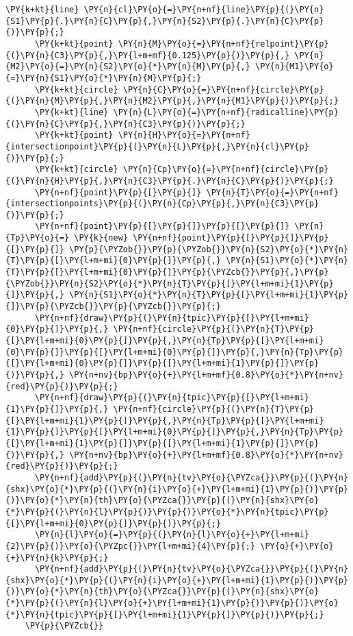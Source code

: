 \begin{Verbatim}[commandchars=\\\{\}]
      \PY{k+kt}{line} \PY{n}{cl}\PY{o}{=}\PY{n+nf}{line}\PY{p}{(}\PY{n}{S1}\PY{p}{.}\PY{n}{C}\PY{p}{,}\PY{n}{S2}\PY{p}{.}\PY{n}{C}\PY{p}{)}\PY{p}{;}
      \PY{k+kt}{point} \PY{n}{M}\PY{o}{=}\PY{n+nf}{relpoint}\PY{p}{(}\PY{n}{C3}\PY{p}{,}\PY{l+m+mf}{0.125}\PY{p}{)}\PY{p}{,} \PY{n}{M2}\PY{o}{=}\PY{n}{S2}\PY{o}{*}\PY{n}{M}\PY{p}{,} \PY{n}{M1}\PY{o}{=}\PY{n}{S1}\PY{o}{*}\PY{n}{M}\PY{p}{;}
      \PY{k+kt}{circle} \PY{n}{C}\PY{o}{=}\PY{n+nf}{circle}\PY{p}{(}\PY{n}{M}\PY{p}{,}\PY{n}{M2}\PY{p}{,}\PY{n}{M1}\PY{p}{)}\PY{p}{;}
      \PY{k+kt}{line} \PY{n}{L}\PY{o}{=}\PY{n+nf}{radicalline}\PY{p}{(}\PY{n}{C}\PY{p}{,}\PY{n}{C3}\PY{p}{)}\PY{p}{;}
      \PY{k+kt}{point} \PY{n}{H}\PY{o}{=}\PY{n+nf}{intersectionpoint}\PY{p}{(}\PY{n}{L}\PY{p}{,}\PY{n}{cl}\PY{p}{)}\PY{p}{;}
      \PY{k+kt}{circle} \PY{n}{Cp}\PY{o}{=}\PY{n+nf}{circle}\PY{p}{(}\PY{n}{H}\PY{p}{,}\PY{n}{C3}\PY{p}{.}\PY{n}{C}\PY{p}{)}\PY{p}{;}
      \PY{n+nf}{point}\PY{p}{[}\PY{p}{]} \PY{n}{T}\PY{o}{=}\PY{n+nf}{intersectionpoints}\PY{p}{(}\PY{n}{Cp}\PY{p}{,}\PY{n}{C3}\PY{p}{)}\PY{p}{;}
      \PY{n+nf}{point}\PY{p}{[}\PY{p}{]}\PY{p}{[}\PY{p}{]} \PY{n}{Tp}\PY{o}{=} \PY{k}{new} \PY{n+nf}{point}\PY{p}{[}\PY{p}{]}\PY{p}{[}\PY{p}{]} \PY{p}{\PYZob{}}\PY{p}{\PYZob{}}\PY{n}{S2}\PY{o}{*}\PY{n}{T}\PY{p}{[}\PY{l+m+mi}{0}\PY{p}{]}\PY{p}{,} \PY{n}{S1}\PY{o}{*}\PY{n}{T}\PY{p}{[}\PY{l+m+mi}{0}\PY{p}{]}\PY{p}{\PYZcb{}}\PY{p}{,}\PY{p}{\PYZob{}}\PY{n}{S2}\PY{o}{*}\PY{n}{T}\PY{p}{[}\PY{l+m+mi}{1}\PY{p}{]}\PY{p}{,} \PY{n}{S1}\PY{o}{*}\PY{n}{T}\PY{p}{[}\PY{l+m+mi}{1}\PY{p}{]}\PY{p}{\PYZcb{}}\PY{p}{\PYZcb{}}\PY{p}{;}
      \PY{n+nf}{draw}\PY{p}{(}\PY{n}{tpic}\PY{p}{[}\PY{l+m+mi}{0}\PY{p}{]}\PY{p}{,} \PY{n+nf}{circle}\PY{p}{(}\PY{n}{T}\PY{p}{[}\PY{l+m+mi}{0}\PY{p}{]}\PY{p}{,}\PY{n}{Tp}\PY{p}{[}\PY{l+m+mi}{0}\PY{p}{]}\PY{p}{[}\PY{l+m+mi}{0}\PY{p}{]}\PY{p}{,}\PY{n}{Tp}\PY{p}{[}\PY{l+m+mi}{0}\PY{p}{]}\PY{p}{[}\PY{l+m+mi}{1}\PY{p}{]}\PY{p}{)}\PY{p}{,} \PY{n+nv}{bp}\PY{o}{+}\PY{l+m+mf}{0.8}\PY{o}{*}\PY{n+nv}{red}\PY{p}{)}\PY{p}{;}
      \PY{n+nf}{draw}\PY{p}{(}\PY{n}{tpic}\PY{p}{[}\PY{l+m+mi}{1}\PY{p}{]}\PY{p}{,} \PY{n+nf}{circle}\PY{p}{(}\PY{n}{T}\PY{p}{[}\PY{l+m+mi}{1}\PY{p}{]}\PY{p}{,}\PY{n}{Tp}\PY{p}{[}\PY{l+m+mi}{1}\PY{p}{]}\PY{p}{[}\PY{l+m+mi}{0}\PY{p}{]}\PY{p}{,}\PY{n}{Tp}\PY{p}{[}\PY{l+m+mi}{1}\PY{p}{]}\PY{p}{[}\PY{l+m+mi}{1}\PY{p}{]}\PY{p}{)}\PY{p}{,} \PY{n+nv}{bp}\PY{o}{+}\PY{l+m+mf}{0.8}\PY{o}{*}\PY{n+nv}{red}\PY{p}{)}\PY{p}{;}
      \PY{n+nf}{add}\PY{p}{(}\PY{n}{tv}\PY{o}{\PYZca{}}\PY{p}{(}\PY{n}{shx}\PY{o}{*}\PY{p}{(}\PY{n}{i}\PY{o}{+}\PY{l+m+mi}{1}\PY{p}{)}\PY{p}{)}\PY{o}{*}\PY{n}{th}\PY{o}{\PYZca{}}\PY{p}{(}\PY{n}{shx}\PY{o}{*}\PY{p}{(}\PY{n}{l}\PY{p}{)}\PY{p}{)}\PY{o}{*}\PY{n}{tpic}\PY{p}{[}\PY{l+m+mi}{0}\PY{p}{]}\PY{p}{)}\PY{p}{;}
      \PY{n}{l}\PY{o}{=}\PY{p}{(}\PY{n}{l}\PY{o}{+}\PY{l+m+mi}{2}\PY{p}{)}\PY{o}{\PYZpc{}}\PY{l+m+mi}{4}\PY{p}{;} \PY{o}{+}\PY{o}{+}\PY{n}{k}\PY{p}{;}
      \PY{n+nf}{add}\PY{p}{(}\PY{n}{tv}\PY{o}{\PYZca{}}\PY{p}{(}\PY{n}{shx}\PY{o}{*}\PY{p}{(}\PY{n}{i}\PY{o}{+}\PY{l+m+mi}{1}\PY{p}{)}\PY{p}{)}\PY{o}{*}\PY{n}{th}\PY{o}{\PYZca{}}\PY{p}{(}\PY{n}{shx}\PY{o}{*}\PY{p}{(}\PY{n}{l}\PY{o}{+}\PY{l+m+mi}{1}\PY{p}{)}\PY{p}{)}\PY{o}{*}\PY{n}{tpic}\PY{p}{[}\PY{l+m+mi}{1}\PY{p}{]}\PY{p}{)}\PY{p}{;}
    \PY{p}{\PYZcb{}}
\end{Verbatim}
